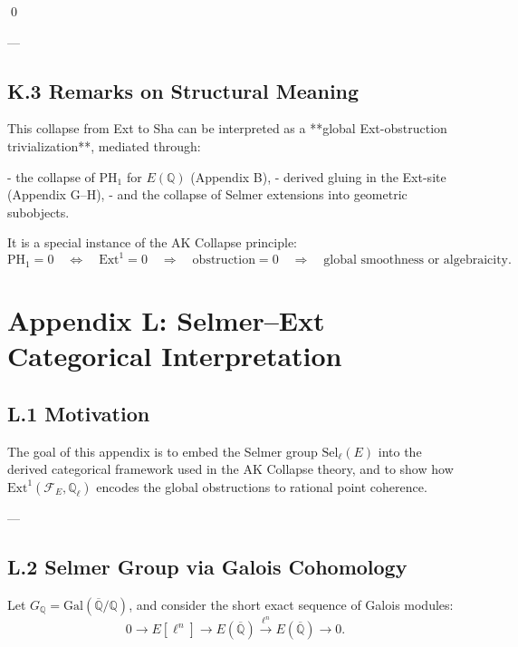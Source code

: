 \qed

---

\subsection*{K.3 Remarks on Structural Meaning}

This collapse from Ext to Sha can be interpreted as a **global Ext-obstruction trivialization**, mediated through:

- the collapse of PH$_1$ for \( E(\mathbb{Q}) \) (Appendix B),
- derived gluing in the Ext-site (Appendix G–H),
- and the collapse of Selmer extensions into geometric subobjects.

It is a special instance of the AK Collapse principle:  
\[
\mathrm{PH}_1 = 0 \quad \Leftrightarrow \quad \mathrm{Ext}^1 = 0 \quad \Rightarrow \quad \text{obstruction} = 0 \quad \Rightarrow \quad \text{global smoothness or algebraicity}.
\]



\section*{Appendix L: Selmer--Ext Categorical Interpretation}

\subsection*{L.1 Motivation}

The goal of this appendix is to embed the Selmer group \( \mathrm{Sel}_\ell(E) \)  
into the derived categorical framework used in the AK Collapse theory,  
and to show how \( \mathrm{Ext}^1(\mathcal{F}_E, \mathbb{Q}_\ell) \) encodes the global obstructions to rational point coherence.

---

\subsection*{L.2 Selmer Group via Galois Cohomology}

Let \( G_\mathbb{Q} = \mathrm{Gal}(\overline{\mathbb{Q}}/\mathbb{Q}) \), and consider the short exact sequence of Galois modules:
\[
0 \longrightarrow E[\ell^n] \longrightarrow E(\overline{\mathbb{Q}}) \xrightarrow{\ell^n} E(\overline{\mathbb{Q}}) \longrightarrow 0.
\]

